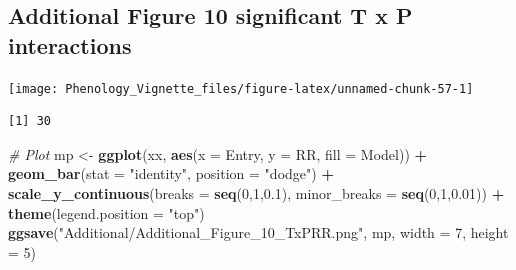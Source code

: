\documentclass[
]{article}
\newenvironment{Shaded}{\begin{snugshade}}{\end{snugshade}}
\newcommand{\CommentTok}[1]{\textcolor[rgb]{0.56,0.35,0.01}{\textit{#1}}}
\newcommand{\DataTypeTok}[1]{\textcolor[rgb]{0.13,0.29,0.53}{#1}}
\newcommand{\DecValTok}[1]{\textcolor[rgb]{0.00,0.00,0.81}{#1}}
\newcommand{\FloatTok}[1]{\textcolor[rgb]{0.00,0.00,0.81}{#1}}
\newcommand{\KeywordTok}[1]{\textcolor[rgb]{0.13,0.29,0.53}{\textbf{#1}}}
\newcommand{\NormalTok}[1]{#1}
\newcommand{\OperatorTok}[1]{\textcolor[rgb]{0.81,0.36,0.00}{\textbf{#1}}}
\newcommand{\StringTok}[1]{\textcolor[rgb]{0.31,0.60,0.02}{#1}}
\begin{document}
\hypertarget{additional-figure-10-significant-t-x-p-interactions}{%
\subsection{Additional Figure 10 significant T x P
interactions}\label{additional-figure-10-significant-t-x-p-interactions}}

\texttt{[image: Phenology\_Vignette\_files/figure-latex/unnamed-chunk-57-1]}

\begin{Shaded}
\end{Shaded}

\begin{verbatim}
[1] 30
\end{verbatim}

\begin{Shaded}
\begin{Highlighting}[]
\CommentTok{# Plot}
\NormalTok{mp <-}\StringTok{ }\KeywordTok{ggplot}\NormalTok{(xx, }\KeywordTok{aes}\NormalTok{(}\DataTypeTok{x =}\NormalTok{ Entry, }\DataTypeTok{y =}\NormalTok{ RR, }\DataTypeTok{fill =}\NormalTok{ Model)) }\OperatorTok{+}\StringTok{ }
\StringTok{  }\KeywordTok{geom_bar}\NormalTok{(}\DataTypeTok{stat =} \StringTok{"identity"}\NormalTok{, }\DataTypeTok{position =} \StringTok{"dodge"}\NormalTok{) }\OperatorTok{+}
\StringTok{  }\KeywordTok{scale_y_continuous}\NormalTok{(}\DataTypeTok{breaks =} \KeywordTok{seq}\NormalTok{(}\DecValTok{0}\NormalTok{,}\DecValTok{1}\NormalTok{,}\FloatTok{0.1}\NormalTok{), }\DataTypeTok{minor_breaks =} \KeywordTok{seq}\NormalTok{(}\DecValTok{0}\NormalTok{,}\DecValTok{1}\NormalTok{,}\FloatTok{0.01}\NormalTok{)) }\OperatorTok{+}
\StringTok{  }\KeywordTok{theme}\NormalTok{(}\DataTypeTok{legend.position =} \StringTok{"top"}\NormalTok{) }
\KeywordTok{ggsave}\NormalTok{(}\StringTok{"Additional/Additional_Figure_10_TxPRR.png"}\NormalTok{, mp, }\DataTypeTok{width =} \DecValTok{7}\NormalTok{, }\DataTypeTok{height =} \DecValTok{5}\NormalTok{)}
\end{Highlighting}
\end{Shaded}
\end{document}
